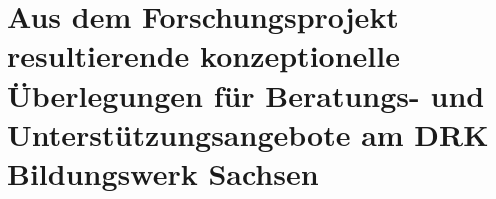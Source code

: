 \section[Konzeptionelle Überlegungen für das DRK Bildungswerk Sachsen]{Aus dem Forschungsprojekt resultierende konzeptionelle Überlegungen für Beratungs- und Unterstützungsangebote am DRK Bildungswerk Sachsen}
\label{sec:AusDemForschungsprojektResultierendeKonzeptionelleÜberlegungenFürBeratungsUndUnterstützungsangeboteAmDRKBildungswerkSachsen}

